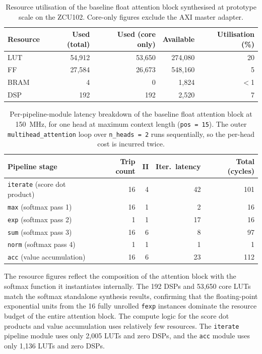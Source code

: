 \begin{table}[H]
  \centering
  \begin{tabular}{lrrrr}
    \toprule
    Resource & Used (total) & Used (core only) & Available & Utilisation (\%) \\
    \midrule
    LUT  & 54{,}912 & 53{,}650 & 274{,}080 & 20 \\
    FF   & 27{,}584 & 26{,}673 & 548{,}160 &  5 \\
    BRAM & 4        & 0        &   1{,}824 & $<$1 \\
    DSP  & 192      & 192      &   2{,}520 &  7 \\
    \bottomrule
  \end{tabular}
  \caption{Resource utilisation of the baseline float attention block
           synthesised at prototype scale on the ZCU102. Core-only figures
           exclude the AXI master adapter.}
  \label{tab:attn_fp32_resources}
\end{table}

\begin{table}[H]
  \centering
  \begin{tabular}{lrrrr}
    \toprule
    Pipeline stage & Trip count & II & Iter.\ latency & Total (cycles) \\
    \midrule
    \texttt{iterate} (score dot product)  & 16 &  4 & 42 & 101 \\
    \texttt{max}     (softmax pass 1)     & 16 &  1 &  2 &  16 \\
    \texttt{exp}     (softmax pass 2)     &  1 &  1 & 17 &  16 \\
    \texttt{sum}     (softmax pass 3)     & 16 &  6 &  8 &  97 \\
    \texttt{norm}    (softmax pass 4)     &  1 &  1 &  1 &   1 \\
    \texttt{acc}     (value accumulation) & 16 &  6 & 23 & 112 \\
    \bottomrule
  \end{tabular}
  \caption{Per-pipeline-module latency breakdown of the baseline float
           attention block at \SI{150}{\mega\hertz}, for one head at
           maximum context length (\texttt{pos\,=\,15}). The outer
           \texttt{multihead\_attention} loop over \texttt{n\_heads\,=\,2}
           runs sequentially, so the per-head cost is incurred twice.}
  \label{tab:attn_fp32_latency}
\end{table}

The resource figures reflect the composition of the attention block
with the softmax function it instantiates internally. The 192 DSPs and 53{,}650
core LUTs match the softmax standalone synthesis results,
confirming that the floating-point exponential units from the 16 fully
unrolled \texttt{fexp} instances dominate the resource budget of the
entire attention block. The compute logic for the score dot products
and value accumulation uses relatively few resources.
The \texttt{iterate} pipeline module uses only 2{,}005 LUTs and zero
DSPs, and the \texttt{acc} module uses only 1{,}136 LUTs and zero DSPs.

